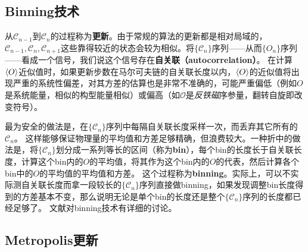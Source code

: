 \documentclass[UTF8]{ctexart}
\newcommand*{\concept}[1]{{\textbf{#1}}}
\begin{document}
\subsection{Binning技术}

从$\mathcal{C}_{n-1}$到$\mathcal{C}_n$的过程称为\concept{更新}。由于常规的算法的更新都是相对局域的，$\mathcal{C}_{n-1}, \mathcal{C}_n, \mathcal{C}_{n+1}$这些靠得较近的状态会较为相似。将$\{\mathcal{C}_n\}$序列——从而$\{O_n\}$序列——看成一个信号，我们说这个信号存在\concept{自关联（autocorrelation）}。
在计算$\expval{O}$近似值时，如果更新步数在马尔可夫链的自关联长度以内，$\expval{O}$的近似值将出现严重的系统性偏差，对其方差的估算也是非常不准确的，可能严重偏低（例如$O$是系统能量，相似的构型能量相似）或偏高（如$\mathcal{O}$是\emph{反铁磁}序参量，翻转自旋即改变符号）。

最为安全的做法是，在$\{\mathcal{C}_n\}$序列中每隔自关联长度采样一次，而丢弃其它所有的$\mathcal{C}_n$。
这样能够保证物理量的平均值和方差足够精确，但浪费较大。一种折中的做法是，将$\{\mathcal{C}_n\}$划分成一系列等长的区间（称为\concept{bin}），每个bin的长度长于自关联长度，计算这个bin内的$O$的平均值，将其作为这个bin内的$O$的代表，然后计算各个bin中的$O$的平均值的平均值和方差。
这个过程称为\concept{binning}。实际上，可以不实际测自关联长度而拿一段较长的$\{\mathcal{C}_n\}$序列直接做binning，如果发现调整bin长度得到的方差基本不变，那么说明无论是单个bin的长度还是整个$\{\mathcal{C}_n\}$序列的长度都已经足够了。
文献\cite{landau2021guide}对binning技术有详细的讨论。

\subsection{Metropolis更新}
\end{document}
